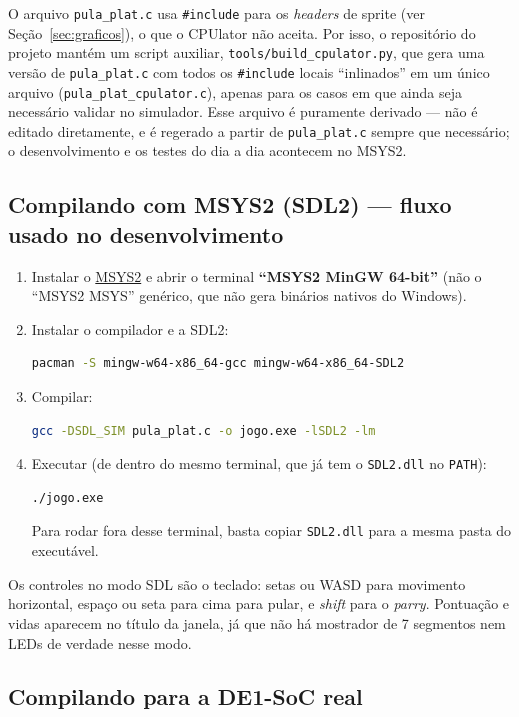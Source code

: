 \documentclass[a4paper,12pt]{article}
\newcommand{\code}[1]{\texttt{#1}}
\begin{document}
O arquivo \code{pula\_plat.c} usa \code{\#include} para os \emph{headers} de
sprite (ver Seção~\ref{sec:graficos}), o que o CPUlator não aceita. Por isso,
o repositório do projeto mantém um script auxiliar, \code{tools/build\_cpulator.py}, que
gera uma versão de \code{pula\_plat.c} com todos os \code{\#include} locais
``inlinados'' em um único arquivo (\code{pula\_plat\_cpulator.c}), apenas para
os casos em que ainda seja necessário validar no simulador. Esse arquivo é
puramente derivado --- não é editado diretamente, e é regerado a partir de
\code{pula\_plat.c} sempre que necessário; o desenvolvimento e os testes do
dia a dia acontecem no MSYS2.

\subsection{Compilando com MSYS2 (SDL2) --- fluxo usado no desenvolvimento}

\begin{enumerate}
    \item Instalar o \href{https://www.msys2.org/}{MSYS2} e abrir o terminal
    \textbf{``MSYS2 MinGW 64-bit''} (não o ``MSYS2 MSYS'' genérico, que não
    gera binários nativos do Windows).
    \item Instalar o compilador e a SDL2:
\begin{lstlisting}[language=bash,numbers=none]
pacman -S mingw-w64-x86_64-gcc mingw-w64-x86_64-SDL2
\end{lstlisting}
    \item Compilar:
\begin{lstlisting}[language=bash,numbers=none]
gcc -DSDL_SIM pula_plat.c -o jogo.exe -lSDL2 -lm
\end{lstlisting}
    \item Executar (de dentro do mesmo terminal, que já tem o \code{SDL2.dll}
    no \code{PATH}):
\begin{lstlisting}[language=bash,numbers=none]
./jogo.exe
\end{lstlisting}
    Para rodar fora desse terminal, basta copiar \code{SDL2.dll} para a mesma pasta do executável.
\end{enumerate}

Os controles no modo SDL são o teclado: setas ou WASD para movimento
horizontal, espaço ou seta para cima para pular, e \emph{shift} para o
\emph{parry}. Pontuação e vidas aparecem no título da janela, já que não há
mostrador de 7 segmentos nem LEDs de verdade nesse modo.

\subsection{Compilando para a DE1-SoC real}
\end{document}
